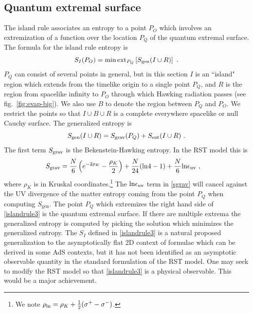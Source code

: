 \documentclass[12pt,oneside,letterpaper]{article}
\newcommand{\be}{\begin{equation}}
\newcommand{\ee}{\end{equation}}
\def\be{\begin{eqnarray}}
\def\ee{\end{eqnarray}}
\def\be{\begin{equation}}
\def\ee{\end{equation}}
\def\euv{\epsilon_{\rm uv}}
\def\log{{\rm ln}}
\numberwithin{equation}{section}
\def \be {\begin{equation}}
\def \ee {\end{equation}}
\begin{document}
\subsection{Quantum extremal surface}\label{ss:qesentropy}
The island rule  associates an entropy to a point $P_O$ which  involves an extremization of a function over the location $P_Q$ of the quantum extremal surface. The formula for the island rule entropy is \cite{Penington:2019npb,Almheiri:2019psf,Almheiri:2019hni} 
\be\label{islandrule3}
S_I(P_O) =   \min \mbox{ext}_{P_Q}\left[ S_{\rm gen}(I \cup R) \right] \ .
\ee
$P_Q$ can consist of several points in general, but in this section $I$ is an ``island" region which extends from the timelike origin to a single point $P_Q$, and $R$ is the region from spacelike infinity to $P_O$ through which Hawking radiation passes (see fig.~\ref{fig:evap-big}). We also use $B$ to denote the region between $P_Q$ and $P_O$. We restrict the points so that  $I\cup B\cup R$ is a complete everywhere spacelike or null Cauchy surface.  
The generalized entropy is 
\be\label{sgen}
S_{\rm gen}(I \cup R) = S_{\rm grav}(P_Q)  + S_{\rm ent }(I \cup R)    \ .
\ee
The first term $S_{\rm grav}$ is the Bekenstein-Hawking entropy. In the RST model this is \cite{Fiola:1994ir}
\begin{align}\label{sgrav}
S_{\rm grav}  &= \frac{N}{6}\left( e^{-2\rho_K} - \frac{\rho_K}{2}\right) + \frac{N}{24}(\log 4 - 1) + \frac{N}{6} \log \euv\ ,
\end{align}
where $\rho_K$ is in Kruskal coordinates.\footnote{We note $ \rho_{\rm in}= \rho_K  + \frac{1}{2}(\sigma^+ - \sigma^-) $.} The $\log \euv $ term in \eqref{sgrav} will cancel against the UV divergence of the matter entropy coming from the point $P_Q$ when computing $S_{\text{gen}}$.  The point $P_Q$ which extremizes the right hand side of \eqref{islandrule3} is the quantum extremal surface.  If there are multiple extrema the generalized entropy is computed by picking the solution which minimizes the generalized entropy. The $S_I$ defined in \eqref{islandrule3} is a natural proposed generalization to the asymptotically flat 2D context of formulae which can be derived in some AdS contexts,  but it has not been identified as an asymptotic observable quantity  in the standard formulation of the RST model. One may seek to modify the RST model so that \eqref{islandrule3} is a physical observable. This would be a major achievement. 
\end{document}
